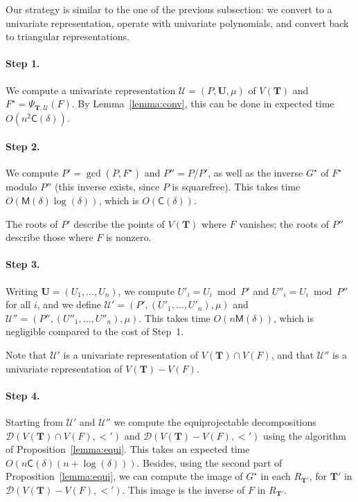 \documentclass[12pt]{article}
\def\CC {\ensuremath{\mathsf{C}}}
\def\M {\ensuremath{\mathsf{M}}}
\def\Tt {\ensuremath{\mathbf{T}}}
\def\Uu {\ensuremath{\mathbf{U}}}
\def\Ur {\ensuremath{\mathscr U}}
\def\Dr {\ensuremath{\mathscr D}}
\begin{document}
Our strategy is similar to the one of the previous subsection: we
convert to a univariate representation, operate with univariate
polynomials, and convert back to triangular representations.

\paragraph{Step 1.} We compute a univariate representation
$\Ur=(P,\Uu,\mu)$ of $V(\Tt)$ and $F^\star=\Psi_{\Tt,\Ur}(F)$. By
Lemma~\ref{lemma:conv}, this can be done in expected time $O(n^2
\CC(\delta))$.

\paragraph{Step 2.} We compute $P'=\gcd(P,F^\star)$ and $P''=P/P'$,
as well as the inverse $G^\star$ of $F^\star$ modulo $P''$ (this
inverse exists, since $P$ is squarefree). This takes time
$O(\M(\delta)\log(\delta))$, which is $O(\CC(\delta))$.

The roots of $P'$ describe the points of $V(\Tt)$ where $F$ vanishes;
the roots of $P''$ describe those where $F$ is nonzero.

\paragraph{Step 3.} Writing $\Uu=(U_1,\dots,U_n)$, we compute $U'_i =
U_i \bmod P'$ and $U''_i=U_i \bmod P''$ for all $i$, and we define
$\Ur'=(P',(U'_1,\dots,U'_n),\mu)$ and
$\Ur''=(P'',(U''_1,\dots,U''_n),\mu)$. This takes time
$O(n\M(\delta))$, which is negligible compared to the cost of Step~1.

Note that $\Ur'$ is a univariate representation of $V(\Tt)\cap V(F)$,
and that $\Ur''$ is a univariate representation of $V(\Tt)- V(F)$.

\paragraph{Step 4.} Starting from $\Ur'$ and $\Ur''$ we compute
the equiprojectable decompositions $\Dr(V(\Tt)\cap V(F),<')$ and
$\Dr(V(\Tt)- V(F),<')$ using the algorithm of
Proposition~\ref{lemma:equi}.  This takes an expected time
$O(n\CC(\delta)(n+\log(\delta))).$ Besides, using the second part of
Proposition~\ref{lemma:equi}, we can compute the image of $G^\star$ in
each $R_{\Tt'}$, for $\Tt'$ in $\Dr(V(\Tt)- V(F),<')$. This image is
the inverse of $F$ in $R_{\Tt'}$.
\end{document}
